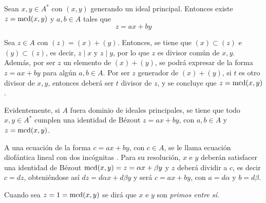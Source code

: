 \begin{prop}
\item Sean $x,y\in A^*$ con $(x,y)$ generando un ideal principal. Entonces existe $z = \text{mcd}(x,y)$ y $a,b\in A$ tales que \[z = ax + by\]
\end{prop}

\begin{dem}{\cite[p.~42]{GamboaAnillos}}
    Sea $z\in A$ con $(z) = (x) + (y)$. Entonces, se tiene que $(x) \subset (z)$ e $(y) \subset (z)$, es decir, $z\mid x$ y $z\mid y$, por lo que $z$ es divisor común de $x,y$. Además, por ser $z$ un elemento de $(x) + (y)$, se podrá expresar de la forma $z = ax + by$ para algún $a,b\in A$. Por ser $z$ generador de $(x) + (y)$, si $t$ es otro divisor de $x,y$, entonces deberá ser $t$ divisor de $z$, y se concluye que $z = \text{mcd}(x,y)$.
\end{dem}

\begin{obss}
    \item Evidentemente, si $A$ fuera dominio de ideales principales, se tiene que todo $x,y\in A^*$ cumplen una identidad de Bézout $z = ax + by$, con $a,b\in A$ y $z = \text{mcd}(x,y)$.

    \item A una ecuación de la forma $c = ax + by$, con $c\in A$, se le llama ecuación diofántica lineal con dos incógnitas \cite[p.~50]{GamboaAnillos}. Para su resolución, $x$ e $y$ deberán satisfacer una identidad de Bézout $\text{mcd}(x,y) = z = \alpha x + \beta y$ y $z$ deberá dividir a $c$, es decir $c = dz$, obteniéndose así $dz = d\alpha x + d\beta y$ y será $c = ax + by$, con $a = d\alpha$ y $b = d\beta$.

    \item Cuando sea $z = 1 = \text{mcd}(x,y)$ se dirá que $x$ e $y$ son \textit{primos entre sí}. 
    
\end{obss}

